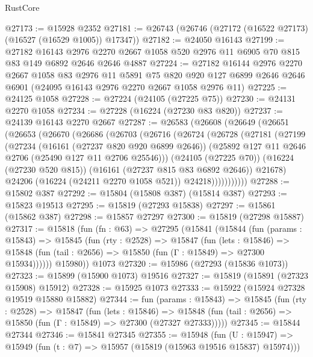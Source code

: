 \begin{lexlean}{RustCore}
\begin{coremodule}
@27173 := @15928 @2352
@27181 := @26743 (@26746 (@27172 (@16522 @27173) (@16527 (@16529 @1005)) @17347))
@27182 := @24050 @16143
@27199 := @27182
    @16143
    @2976
    @2270
    @2667
    @1058
    @520
    @2976
    @11
    @6905
    @70
    @815
    @83
    @149
    @6892
    @2646
    @2646
    @4887
@27224 := @27182
    @16144
    @2976
    @2270
    @2667
    @1058
    @83
    @2976
    @11
    @5891
    @75
    @820
    @920
    @127
    @6899
    @2646
    @2646
    @6901
    (@24095 @16143 @2976 @2270 @2667 @1058 @2976 @11)
@27225 := @24125 @1058
@27228 := @27224 (@24105 (@27225 @75))
@27230 := @24131 @2270 @1058
@27234 := @27228 (@16224 (@27230 @83 @820))
@27237 := @24139 @16143 @2270 @2667
@27287 := @26583
    (@26608
      (@26649
        (@26651
          (@26653
            (@26670
              (@26686
                (@26703
                  (@26716
                    (@26724
                      (@26728
                        (@27181
                          (@27199
                            (@27234
                              (@16161 (@27237 @820 @920 @6899 @2646))
                              (@25892 @127 @11 @2646 @2706 (@25490 @127 @11 @2706 @25546)))
                            (@24105 (@27225 @70))
                            (@16224 (@27230 @520 @815))
                            (@16161 (@27237 @815 @83 @6892 @2646))
                            @21678)
                          @24206
                          (@16224 (@24211 @2270 @1058 @521))
                          @24218)))))))))))
@27288 := @15802 @387
@27292 := @15804 (@15808 @387) (@15814 @387)
@27293 := @15823 @19513
@27295 := @15819 (@27293 @15838)
@27297 := @15861 (@15862 @387)
@27298 := @15857 @27297
@27300 := @15819 (@27298 @15887)
@27317 := @15818
    (fun (fn : @63) =>
    @27295
      (@15841
        (@15844
          (fun (params : @15843) =>
          @15845
            (fun (rty : @2528) =>
            @15847
              (fun (lets : @15846) =>
              @15848 (fun (tail : @2656) => @15850 (fun (Γ : @15849) => @27300 @15934))))))
        @15980))
    @1073
@27320 := @15986 (@27293 (@15836 @1073))
@27323 := @15899 (@15900 @1073) @19516
@27327 := @15819 (@15891 (@27323 @15908) @15912)
@27328 := @15925 @1073
@27333 := @15922 (@15924 @27328 @19519 @15880 @15882)
@27344 := fun (params : @15843) =>
  @15845
    (fun (rty : @2528) =>
    @15847
      (fun (lets : @15846) =>
      @15848 (fun (tail : @2656) => @15850 (fun (Γ : @15849) => @27300 (@27327 @27333)))))
@27345 := @15844 @27344
@27346 := @15841 @27345
@27355 := @15948
    (fun (U : @15947) => @15949 (fun (t : @7) => @15957 (@15819 (@15963 @19516 @15837) @15974)))

\end{coremodule}
\end{lexlean}
